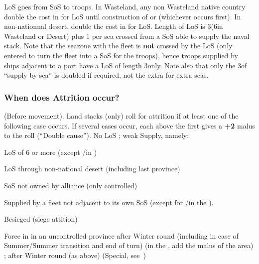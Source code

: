  LoS goes from SoS to troops.
\bparag In Wasteland, any non Wasteland native country double the cost in \MP
for LoS until construction of  or  (whichever occurs first).
\bparag In non-nationnal desert, double the cost in \MP for LoS.
 Length of LoS is 3\MP (6\MP in
Wasteland or Desert) plus 1 per sea crossed from a SoS able to supply the
naval stack.
\bparag Note that the seazone with the fleet is \textbf{not} crossed by the
LoS (only entered to turn the fleet into a SoS for the troops), hence troops
supplied by ships adjacent to a port have a LoS of length 3\MP only.
\bparag Note also that only the 3\MP of ``supply by sea'' is doubled if
required, not the extra \MP for extra seas.

\subsubsection{When does Attrition occur?}
 (Before movement). Land stacks (only) roll for
attrition if at least one of the following case occurs. If several cases
occur, each above the first gives a \textbf{+2} malus to the roll (``Double
cause'').
\bparag No LoS ;
\bparag weak Supply, namely:
\begin{modlist}
\item LoS of 6 or more \MP (except \LD/\LDE in \ROTW)
\item LoS through non-national desert (including last province)
\item SoS not owned by alliance (only controlled)
\item Supplied by a fleet not adjacent to its own SoS
(except for \LD/\LDE in the \ROTW).
\item Besieged (siege attition)
\end{modlist}
\bparag Force in  in an uncontrolled province after Winter
round (including in case of Summer/Summer transition and end of turn) (in the
\ROTW, add the malus of the area) ;
\bparag \Timar after Winter round (as above) (Special,
see~)


